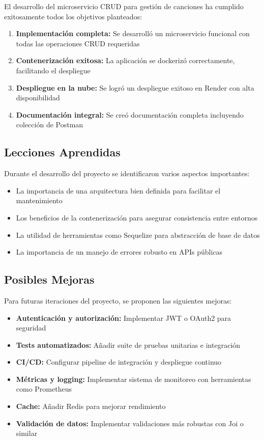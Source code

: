 \documentclass[12pt,a4paper]{article}
\begin{document}
El desarrollo del microservicio CRUD para gestión de canciones ha cumplido exitosamente todos los objetivos planteados:

\begin{enumerate}
    \item \textbf{Implementación completa:} Se desarrolló un microservicio funcional con todas las operaciones CRUD requeridas
    \item \textbf{Contenerización exitosa:} La aplicación se dockerizó correctamente, facilitando el despliegue
    \item \textbf{Despliegue en la nube:} Se logró un despliegue exitoso en Render con alta disponibilidad
    \item \textbf{Documentación integral:} Se creó documentación completa incluyendo colección de Postman
\end{enumerate}

\subsection{Lecciones Aprendidas}

Durante el desarrollo del proyecto se identificaron varios aspectos importantes:

\begin{itemize}
    \item La importancia de una arquitectura bien definida para facilitar el mantenimiento
    \item Los beneficios de la contenerización para asegurar consistencia entre entornos
    \item La utilidad de herramientas como Sequelize para abstracción de base de datos
    \item La importancia de un manejo de errores robusto en APIs públicas
\end{itemize}

\subsection{Posibles Mejoras}

Para futuras iteraciones del proyecto, se proponen las siguientes mejoras:

\begin{itemize}
    \item \textbf{Autenticación y autorización:} Implementar JWT o OAuth2 para seguridad
    \item \textbf{Tests automatizados:} Añadir suite de pruebas unitarias e integración
    \item \textbf{CI/CD:} Configurar pipeline de integración y despliegue continuo
    \item \textbf{Métricas y logging:} Implementar sistema de monitoreo con herramientas como Prometheus
    \item \textbf{Cache:} Añadir Redis para mejorar rendimiento
    \item \textbf{Validación de datos:} Implementar validaciones más robustas con Joi o similar
\end{itemize}
\end{document}
